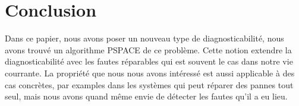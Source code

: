 \documentclass[10pt,a4paper]{article}
\begin{document}
\section*{Conclusion}

Dans ce papier, nous avons poser un nouveau type de diagnosticabilit\'e, nous 
avons trouv\'e un algorithme PSPACE de ce probl\`eme. Cette notion extendre la diagnosticabilit\'e avec les fautes r\'eparables qui est souvent le cas dans notre vie courrante. La propri\'et\'e que nous nous avons int\'eress\'e est aussi applicable \`a des cas concr\`etes, par examples dans les syst\`emes qui peut r\'eparer des pannes tout seul, mais nous avons quand m\^eme envie de d\'etecter les fautes qu'il a eu lieu.


\end{document}
